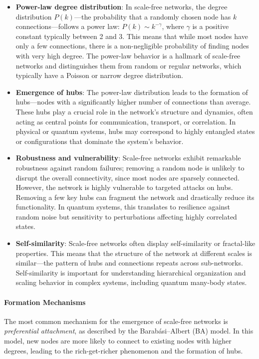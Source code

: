 \documentclass[a4paper, 11pt]{article}
\begin{document}
\begin{itemize}
    \item \textbf{Power-law degree distribution}: In scale-free networks, the degree distribution $P(k)$—the probability that a randomly chosen node has $k$ connections—follows a power law: $P(k) \sim k^{-\gamma}$, where $\gamma$ is a positive constant typically between 2 and 3. This means that while most nodes have only a few connections, there is a non-negligible probability of finding nodes with very high degree. The power-law behavior is a hallmark of scale-free networks and distinguishes them from random or regular networks, which typically have a Poisson or narrow degree distribution.
    \item \textbf{Emergence of hubs}: The power-law distribution leads to the formation of hubs—nodes with a significantly higher number of connections than average. These hubs play a crucial role in the network's structure and dynamics, often acting as central points for communication, transport, or correlation. In physical or quantum systems, hubs may correspond to highly entangled states or configurations that dominate the system's behavior.
    \item \textbf{Robustness and vulnerability}: Scale-free networks exhibit remarkable robustness against random failures; removing a random node is unlikely to disrupt the overall connectivity, since most nodes are sparsely connected. However, the network is highly vulnerable to targeted attacks on hubs. Removing a few key hubs can fragment the network and drastically reduce its functionality. In quantum systems, this translates to resilience against random noise but sensitivity to perturbations affecting highly correlated states.
    \item \textbf{Self-similarity}: Scale-free networks often display self-similarity or fractal-like properties. This means that the structure of the network at different scales is similar—the pattern of hubs and connections repeats across sub-networks. Self-similarity is important for understanding hierarchical organization and scaling behavior in complex systems, including quantum many-body states.
\end{itemize}

\paragraph{Formation Mechanisms}
The most common mechanism for the emergence of scale-free networks is \textit{preferential attachment}, as described by the Barabási–Albert (BA) model. In this model, new nodes are more likely to connect to existing nodes with higher degrees, leading to the rich-get-richer phenomenon and the formation of hubs.
\end{document}
